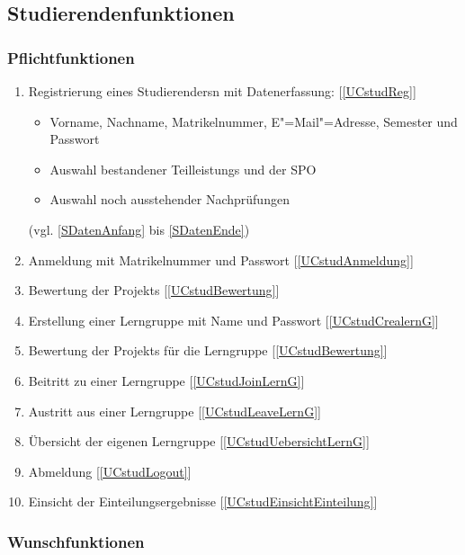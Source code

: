 \documentclass[parskip=full]{scrartcl}
\newcommand{\swtLabel}[1]{\textbf{/#1\arabic*0/}}
\newcommand{\testRef}[1]{[\ref{#1}]}
\begin{document}
\subsection{Studierendenfunktionen}

\subsubsection{Pflichtfunktionen}

\begin{enumerate}[label=\swtLabel{FA}, resume]
  \item Registrierung eines \glspl{Studierender}n mit Datenerfassung: \testRef{UCstudReg}
  \label{FAregistrierung}
  \begin{itemize}
    \item Vorname, Nachname, \gls{Matrikelnummer}, E"=Mail"=Adresse, Semester und
    Passwort
    \item Auswahl bestandener \glspl{Teilleistung} und der \gls{SPO}
    \item Auswahl noch ausstehender Nachprüfungen 
  \end{itemize}
  (vgl.  \ref{SDatenAnfang} bis \ref{SDatenEnde})
  \item Anmeldung mit \gls{Matrikelnummer} und Passwort\label{FAStudanmeldung}
  \testRef{UCstudAnmeldung}
  \item \gls{Bewertung} der \glspl{Projekt} \label{FAbewertung} \testRef{UCstudBewertung}
  \item Erstellung einer \gls{Lerngruppe} mit Name und Passwort
  \label{FAcreatelerng} \testRef{UCstudCrealernG}
  \item \gls{Bewertung} der \glspl{Projekt} für die \gls{Lerngruppe} 
  \label{FAbewertung2} \testRef{UCstudBewertung}
  \item Beitritt zu einer \gls{Lerngruppe} \label{FAjoinLerng}
  \testRef{UCstudJoinLernG}
  \item Austritt aus einer \gls{Lerngruppe} \label{FAlergAustritt}
  \testRef{UCstudLeaveLernG}
  \item Übersicht der eigenen \gls{Lerngruppe} 
  \label{FAcheckLerng} \testRef{UCstudUebersichtLernG}
  \item Abmeldung \label{FAStudabmeldung} \testRef{UCstudLogout}
  \item Einsicht der \gls{Einteilung}sergebnisse \label{FAStudeinsicht} \testRef{UCstudEinsichtEinteilung}
\end{enumerate}

\subsubsection{Wunschfunktionen}
\end{document}
